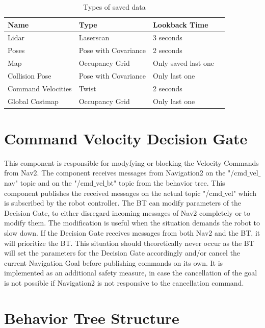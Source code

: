 \begin{table}[h!]
	\caption{Types of saved data}
	\begin{tabular}{ | m{} | m{}| m{} | m{} |} 
  	\hline
  	Name & Type & Lookback Time \\ 
  	\hline
  	Lidar & Laserscan & 3 seconds \\
  	\hline
  	Poses & Pose with Covariance & 2 seconds\\ 
  	\hline
  	Map & Occupancy Grid & Only saved last one \\ 
  	\hline
  	Collision Pose & Pose with Covariance & Only last one \\
  	\hline
  	Command Velocities & Twist & 2 seconds\\
  	\hline  	
  	Global Costmap & Occupancy Grid & Only last one \\
  	\hline
	\end{tabular}
\end{table}

\section{Command Velocity Decision Gate}

This component is responsible for modyfying or blocking the Velocity Commands from Nav2. The component receives messages from Navigation2 on the "/cmd$\_$vel$\_$nav" topic and on the "/cmd$\_$vel$\_$bt" topic from the behavior tree. This component publishes the received messages on the actual topic "/cmd$\_$vel" which is subscribed by the robot controller. 
The BT can modify parameters of the Decision Gate, to either disregard incoming messages of Nav2 completely or to modify them. The modification is useful when the situation demands the robot to slow down. If the Decision Gate receives messages from both Nav2 and the BT, it will prioritize the BT. This situation should theoretically never occur as the BT will set the parameters for the Decision Gate accordingly and/or cancel the current Navigation Goal before publishing commands on its own. It is implemented as an additional safety measure, in case the cancellation of the goal is not possible if Navigation2 is not responsive to the cancellation command. 

\section{Behavior Tree Structure}

